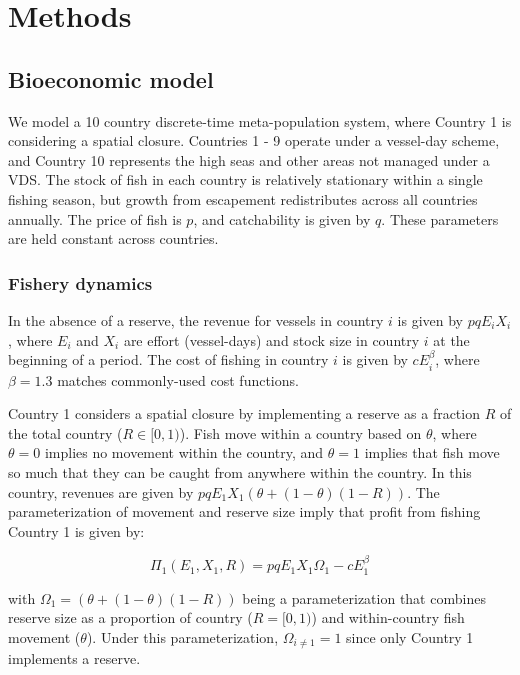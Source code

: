 \documentclass[12pt]{article}
\begin{document}
\clearpage

\section{Methods}

\subsection{Bioeconomic model}

We model a 10 country discrete-time meta-population system, where Country 1 is considering a spatial closure. Countries 1 - 9 operate under a vessel-day scheme, and Country 10 represents the high seas and other areas not managed under a VDS. The stock of fish in each country is relatively stationary within a single fishing season, but  growth from escapement redistributes across all countries annually. The price of fish is $p$, and catchability is given by $q$. These parameters are held constant across countries.

\subsubsection{Fishery dynamics}

In the absence of a reserve, the revenue for vessels in country $i$ is given by $pqE_iX_i$, where $E_i$ and $X_i$ are effort (vessel-days) and stock size in country $i$ at the beginning of a period. The cost of fishing in country $i$ is given by $cE_i^\beta$, where $\beta = 1.3$ matches commonly-used cost functions.

Country 1 considers a spatial closure by implementing a reserve as a fraction $R$ of the total country ($R \in[0,1)$). Fish move within a country based on $\theta$, where $\theta = 0$ implies no movement within the country, and $\theta = 1$ implies that fish move so much that they can be caught from anywhere within the country. In this country, revenues are given by $pqE_1X_1(\theta + (1 - \theta)(1 - R))$. The parameterization of movement and reserve size imply that profit from fishing Country 1 is given by:

$$
\Pi_1(E_1,X_1,R) = pqE_1X_1\Omega_1-cE_1^\beta
$$

\noindent with $\Omega_1 = (\theta + (1 - \theta)(1 - R))$ being a parameterization that combines reserve size as a proportion of country ($R =  [0, 1)$) and within-country fish movement ($\theta$). Under this parameterization, $\Omega_{i \neq 1} = 1$ since only Country 1 implements a reserve.
\end{document}
